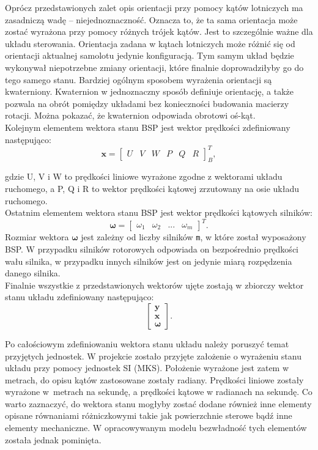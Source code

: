 Oprócz przedstawionych zalet opis orientacji przy pomocy kątów lotniczych ma zasadniczą wadę -- niejednoznaczność. Oznacza to, że ta sama orientacja może zostać wyrażona przy pomocy różnych trójek kątów. Jest to szczególnie ważne dla układu sterowania. Orientacja zadana w kątach lotniczych może różnić się od orientacji aktualnej samolotu jedynie konfiguracją. Tym samym układ będzie wykonywał niepotrzebne zmiany orientacji, które finalnie doprowadziłyby go do tego samego stanu. Bardziej ogólnym sposobem wyrażenia orientacji są kwaterniony. Kwaternion w jednoznaczny sposób definiuje orientację, a także pozwala na obrót pomiędzy układami bez konieczności budowania macierzy rotacji. Można pokazać, że kwaternion odpowiada obrotowi oś-kąt.\\

Kolejnym elementem wektora stanu BSP jest wektor prędkości zdefiniowany następująco:
\[
	\bm{x} = \begin{bmatrix}U & V & W &  P & Q & R  \end{bmatrix}^{T}_{B},
 \]
 
 gdzie U, V i W to prędkości liniowe wyrażone zgodne z wektorami układu ruchomego, a P, Q i R to wektor prędkości kątowej zrzutowany na osie układu ruchomego.\\
 
 Ostatnim elementem wektora stanu BSP jest wektor prędkości kątowych silników:
 \[
	\bm{\omega} = \begin{bmatrix}\omega_1 & \omega_2 & ... &  \omega_{m}  \end{bmatrix}^{T}.
 \]
 Rozmiar wektora $\bm{\omega}$ jest zależny od liczby silników \texttt{m}, w które został wyposażony BSP. W przypadku silników rotorowych odpowiada on bezpośrednio prędkości wału silnika, w przypadku innych silników jest on jedynie miarą rozpędzenia danego silnika.\\
 
Finalnie wszystkie z przedstawionych wektorów ujęte zostają w zbiorczy wektor stanu układu zdefiniowany następująco:
\[
      	\begin{bmatrix} \bm{y}\\ \bm{x} \\  \bm{\omega} \end{bmatrix}.
\]

Po całościowym zdefiniowaniu wektora stanu układu należy poruszyć temat przyjętych jednostek. W projekcie zostało przyjęte założenie o wyrażeniu stanu układu przy pomocy jednostek SI (MKS). Położenie wyrażone jest zatem w metrach, do opisu kątów zastosowane zostały radiany. Prędkości liniowe zostały wyrażone w~metrach na sekundę, a prędkości kątowe w radianach na sekundę.
Co warto zaznaczyć, do wektora stanu mogłyby zostać dodane również inne elementy opisane równaniami różniczkowymi takie jak powierzchnie sterowe bądź inne elementy mechaniczne. W opracowywanym modelu bezwładność tych elementów została jednak pominięta.

